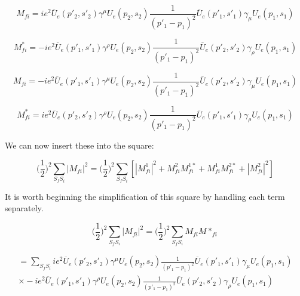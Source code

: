 \documentclass[a4]{article}
\begin{document}
    \begin{equation}
        M_{fi} = i e^2 \overline{U}_e (p'_2, s'_2) \gamma^{\mu} U_e (p_2, s_2) \frac{1}{(p'_1 - p_1)^2} \overline{U}_e (p'_1, s'_1) \gamma_{\mu} U_e (p_1, s_1)
    \end{equation}

    \begin{equation}
        \boxed{M_{fi}^* = - i e^2 \overline{U}_e (p'_1, s'_1) \gamma^{\rho} U_e (p_2, s_2) \frac{1}{(p'_1 - p_1)^2} \overline{U}_e (p'_2, s'_2) \gamma_{\rho} U_e (p_1, s_1)}
    \end{equation}

    \begin{equation}
        M_{fi} = - i e^2 \overline{U}_e (p'_1, s'_1) \gamma^{\mu} U_e (p_2, s_2) \frac{1}{(p'_1 - p_1)^2} \overline{U}_e (p'_2, s'_2) \gamma_{\mu} U_e (p_1, s_1)
    \end{equation}

    \begin{equation}
        \boxed{M_{fi}^* = i e^2 \overline{U}_e (p'_2, s'_2) \gamma^{\rho} U_e (p_2, s_2) \frac{1}{(p'_1 - p_1)^2} \overline{U}_e (p'_1, s'_1) \gamma_{\rho} U_e (p_1, s_1)}
    \end{equation}

    We can now insert these into the square:

    \begin{equation}
        \bigg( \frac{1}{2} \bigg)^2 \sum_{S_f S_i} |M_{f i}|^2 = \bigg( \frac{1}{2} \bigg)^2 \sum_{S_f S_i} [|M_{f i}^1|^2+M_{fi}^2 M_{fi}^{1*} + M_{fi}^1 M_{fi}^{2*} + |M_{f i}^2|^2]
    \end{equation}

    It is worth beginning the simplification of this square by handling each term separately.

    \begin{equation}
        \bigg( \frac{1}{2} \bigg)^2 \sum_{S_f S_i} |M_{f i}|^2 = \bigg( \frac{1}{2} \bigg)^2 \sum_{S_f S_i} M_{fi} M*_{fi}
    \end{equation}

    \begin{eqnarray}
        = \sum_{S_f S_i} i e^2 \overline{U}_e (p'_2, s'_2) \gamma^{\mu} U_e (p_2, s_2) \frac{1}{(p'_1 - p_1)^2} \overline{U}_e (p'_1, s'_1) \gamma_{\mu} U_e (p_1, s_1) \\
        \times - i e^2 \overline{U}_e (p'_1, s'_1) \gamma^{\rho} U_e (p_2, s_2) \frac{1}{(p'_1 - p_1)^2} \overline{U}_e (p'_2, s'_2) \gamma_{\rho} U_e (p_1, s_1)
    \end{eqnarray}
\end{document}
